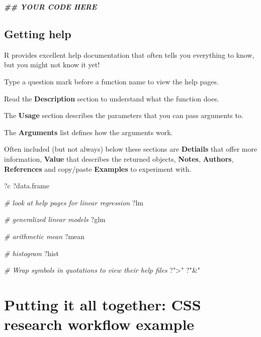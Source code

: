 \documentclass[
]{article}
\newenvironment{Shaded}{\begin{snugshade}}{\end{snugshade}}
\newcommand{\CommentTok}[1]{\textcolor[rgb]{0.56,0.35,0.01}{\textit{#1}}}
\newcommand{\DocumentationTok}[1]{\textcolor[rgb]{0.56,0.35,0.01}{\textbf{\textit{#1}}}}
\newcommand{\NormalTok}[1]{#1}
\newcommand{\StringTok}[1]{\textcolor[rgb]{0.31,0.60,0.02}{#1}}
\begin{document}
\begin{Shaded}
\begin{Highlighting}[]
\DocumentationTok{\#\# YOUR CODE HERE}
\end{Highlighting}
\end{Shaded}

\hypertarget{getting-help}{%
\subsection{Getting help}\label{getting-help}}

R provides excellent help documentation that often tells you everything
to know, but you might not know it yet!

Type a question mark before a function name to view the help pages.

Read the \textbf{Description} section to understand what the function
does.

The \textbf{Usage} section describes the parameters that you can pass
arguments to.

The \textbf{Arguments} list defines how the arguments work.

Often included (but not always) below these sections are
\textbf{Detiails} that offer more information, \textbf{Value} that
describes the returned objects, \textbf{Notes}, \textbf{Authors},
\textbf{References} and copy/paste \textbf{Examples} to experiment with.

\begin{Shaded}
\begin{Highlighting}[]
\NormalTok{?c}
\NormalTok{?data.frame}

\CommentTok{\# look at help pages for linear regression}
\NormalTok{?lm}

\CommentTok{\# generalized linear models}
\NormalTok{?glm}

\CommentTok{\# arithmetic mean}
\NormalTok{?mean}

\CommentTok{\# histogram}
\NormalTok{?hist}

\CommentTok{\# Wrap symbols in quotations to view their help files}
\NormalTok{?}\StringTok{"\textgreater{}"}
\NormalTok{?}\StringTok{"\&"}
\end{Highlighting}
\end{Shaded}

\hypertarget{putting-it-all-together-css-research-workflow-example}{%
\section{Putting it all together: CSS research workflow
example}\label{putting-it-all-together-css-research-workflow-example}}
\end{document}
